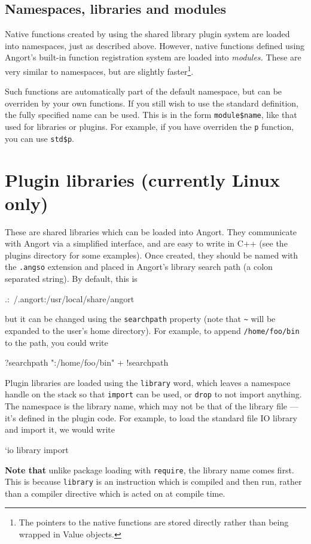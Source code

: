 \subsection{Namespaces, libraries and modules}
\label{nameslibsmods}
Native functions created by using the shared library plugin system
are loaded into namespaces, just as described above. However, native
functions defined using Angort's built-in function registration system
are loaded into \emph{modules.} These are very similar to namespaces,
but are slightly faster\footnote{The pointers to the native functions
are stored directly rather than being wrapped in Value objects.}. 

Such functions are automatically part of the default namespace, but can
be overriden by your own functions. If you still wish to use the standard
definition, the fully specified name can be used. This is in the form
\verb+module$name+, like that used for libraries or plugins. For example,
if you have overriden the \texttt{p} function, you can use \verb+std$p+.

\section{Plugin libraries (currently Linux only)}
\label{library}
These are shared libraries which can be loaded into Angort. They communicate
with Angort via a simplified interface, and are easy to write in C++ (see
the plugins directory for some examples). 
Once created, they should be named with the \texttt{.angso} extension
and placed in Angort's library search path (a colon separated string).
By default, this is 
\begin{v}
.:~/.angort:/usr/local/share/angort
\end{v}
but it can be changed using the 
\texttt{searchpath} property (note that \verb+~+ will be expanded
to the user's home directory). For example, to append \texttt{/home/foo/bin}
to the path, you could write
\begin{v}
?searchpath ":/home/foo/bin" + !searchpath
\end{v}
Plugin libraries are loaded using the \texttt{library} word, which
leaves a namespace handle on the stack so that \texttt{import} can be
used, or \texttt{drop} to not import anything. The namespace is
the library name, which may not be that of the library file --- it's defined
in the plugin code. For example, to load the standard file IO library
and import it, we would write
\begin{v}
`io library import
\end{v}
\textbf{Note that} unlike package loading with \texttt{require},
the library name comes first.
This is because \texttt{library} is an instruction which is compiled and
then run, rather than a compiler directive which is acted on
at compile time.

